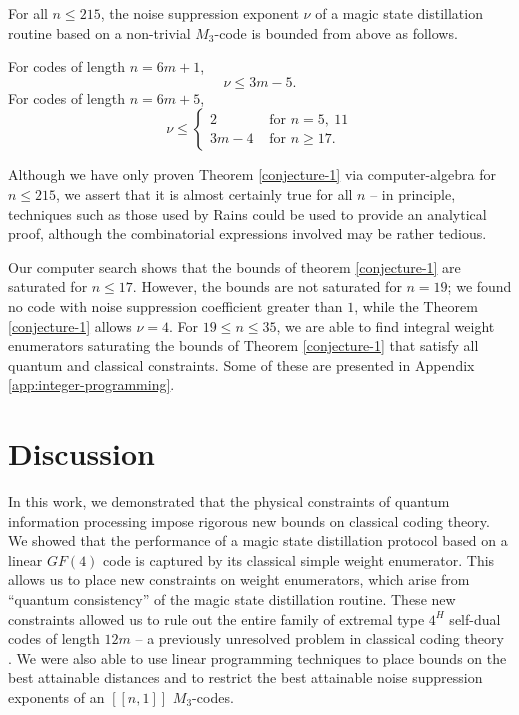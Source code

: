 \documentclass[11pt]{article}
\begin{document}
\begin{theorem}
For all $n\leq 215$, the noise suppression exponent $\nu$ of a magic state distillation routine based on a non-trivial $M_3$-code is bounded from above as follows.

For codes of length $n=6m+1$,
\begin{equation}
    \nu \leq 3m-5.
\end{equation}
For codes of length $n=6m+5$,
\begin{equation}
    \nu \leq \begin{cases}
    2  & \text{    for }n=5,~11 \\3m-4 & \text{    for } n \geq 17.
    \end{cases}
\end{equation}
\label{conjecture-1}
\end{theorem}
Although we have only proven Theorem \ref{conjecture-1} via computer-algebra for $n \leq 215$, we assert that it is almost certainly true for all $n$ -- in principle, techniques such as those used by Rains \cite{rains} could be used to provide an analytical proof, although the combinatorial expressions involved may be rather tedious. 

Our computer search shows that the bounds of theorem \ref{conjecture-1} are saturated for $n \leq 17$. However, the bounds are not saturated for $n=19$; we found no code with noise suppression coefficient greater than $1$, while the Theorem \ref{conjecture-1} allows $\nu=4$. For $19 \leq n\leq 35$, we are able to find integral weight enumerators saturating the bounds of Theorem \ref{conjecture-1} that satisfy all quantum and classical constraints. Some of these are presented in Appendix \ref{app:integer-programming}. 

\section{Discussion}
\label{discussion}
In this work, we demonstrated that the physical constraints of quantum information processing impose rigorous new bounds on classical coding theory. We showed that the performance of a magic state distillation \cite{MSD} protocol based on a linear $GF(4)$ code is captured by its classical simple weight enumerator. This allows us to place new constraints on weight enumerators, which arise from ``quantum consistency'' of the magic state distillation routine. These new constraints allowed us to rule out the entire family of extremal type $4^H$ self-dual codes of length $12m$ -- a previously unresolved problem in classical coding theory \cite{macwilliams1978self, lam1990there, huffman1990extremal, huffman1991extremal}.
We were also able to use linear programming techniques to place bounds on the best attainable distances and to restrict the best attainable noise suppression exponents of an $[[n,1]]$ $M_3$-codes. 
\end{document}
